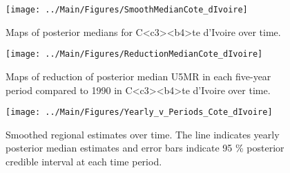 \documentclass[12pt]{article}\usepackage[]{graphicx}\usepackage[]{color}
\newenvironment{knitrout}{}{} %
\begin{document}
\begin{knitrout}
\color{fgcolor}\begin{figure}[bht]

{\centering \texttt{[image: ../Main/Figures/SmoothMedianCote\_dIvoire]} 

}

\caption[Maps of posterior medians for C<c3><b4>te d'Ivoire  over time]{Maps of posterior medians for C<c3><b4>te d'Ivoire  over time.}\label{fig:unnamed-chunk-84}
\end{figure}


\end{knitrout}
\begin{knitrout}
\color{fgcolor}\begin{figure}[bht]

{\centering \texttt{[image: ../Main/Figures/ReductionMedianCote\_dIvoire]} 

}

\caption[Maps of reduction of posterior median U5MR in each five-year period compared to 1990 in C<c3><b4>te d'Ivoire over time]{Maps of reduction of posterior median U5MR in each five-year period compared to 1990 in C<c3><b4>te d'Ivoire over time.}\label{fig:unnamed-chunk-85}
\end{figure}


\end{knitrout}
\begin{knitrout}
\color{fgcolor}\begin{figure}[bht]

{\centering \texttt{[image: ../Main/Figures/Yearly\_v\_Periods\_Cote\_dIvoire]} 

}

\caption[Smoothed regional estimates over time]{Smoothed regional estimates over time. The line indicates yearly posterior median estimates and error bars indicate 95 \% posterior credible interval at each time period.}\label{fig:unnamed-chunk-86}
\end{figure}


\end{knitrout}
\end{document}

